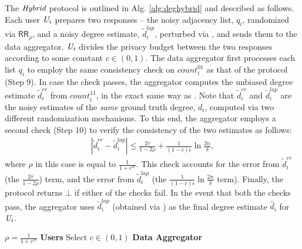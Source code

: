 The $\textit{Hybrid}$ protocol is outlined in Alg. \ref{alg:deghybrid} and described as follows. Each user $\textit{U}_i$ prepares two responses -- the noisy adjacency list, $q_i$, randomized via $\textsf{RR}_{\rho}$, and a noisy degree estimate, $\tilde{d}^{lap}_i$, perturbed via \RLap, and sends them to the data aggregator. $\textit{U}_i$ divides the privacy budget between the two responses according to some constant $c \in (0,1)$. The data aggregator first processes each list $q_i$ to employ the same consistency check on $count^{01}_i$ as that of the \DegRRCheck{} protocol (Step 9).
In case the check passes, the aggregator computes the unbiased degree estimate $\tilde{d}^{rr}_i$ from $count_i^{11}$, in the exact same way as \DegRRCheck. Note that $\tilde{d}^{rr}_i$ and $\tilde{d}^{lap}_i$ are the noisy estimates of the \textit{same} ground truth degree, $d_i$, computed via two different randomization mechanisms. To this end, the aggregator employs a second check (Step 10) to verify the consistency of the two estimates as follows:
\begin{gather*} |\tilde{d}_i^{rr} - \tilde{d}_i^{lap}| \leq \frac{2\tau}{1-2\rho} + \frac{1}{(1-c)\epsilon}\ln \tfrac{2n}{\delta} ,\end{gather*} 
where $\rho$ in this case is equal to $\frac{1}{1+e^{c\epsilon}}$.
This check accounts for the error from $\tilde{d}^{rr}_i$ (the $\frac{2\tau}{1-2\rho}$) term, and the error from $\tilde{d}^{lap}_i$ (the $\frac{1}{(1-c)\epsilon}\ln \tfrac{2n}{\delta}$ term).
Finally, the protocol returns $\bot$ if either of the checks fail.
In the event that both the checks pass, the aggregator uses $\tilde{d}_i^{lap}$ (obtained via \RLap) as the final degree estimate $\hat{d}_i$ for $\textit{U}_i$.

\begin{algorithm}[t]
%  
  $\rho=\frac{1}{1+e^{c\epsilon}}$\;
  \textbf{Users}\;
  Select $c\in (0,1)$\;
  \textbf{Data Aggregator}\;
  \caption{\DegHybrid: $\{0,1\}^{n\times n}\mapsto \{\mathbb{N}\cup \{\bot\}\}^n$}\label{alg:deghybrid}
\end{algorithm}

